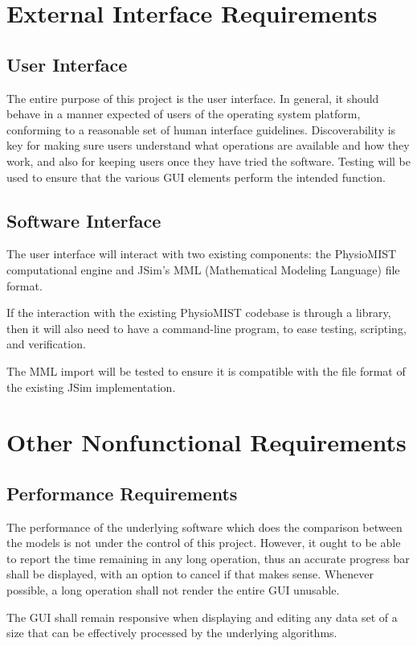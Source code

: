 \documentclass{article}
\begin{document}
\section{External Interface Requirements}
\subsection{User Interface}
The entire purpose of this project is the user interface. In general, it should behave in a manner expected of users of the operating system platform, conforming to a reasonable set of human interface guidelines. Discoverability is key for making sure users understand what operations are available and how they work, and also for keeping users once they have tried the software. Testing will be used to ensure that the various GUI elements perform the intended function.

\subsection{Software Interface}
The user interface will interact with two existing components: the PhysioMIST computational engine and JSim's MML (Mathematical Modeling Language) file format.

If the interaction with the existing PhysioMIST codebase is through a library, then it will also need to have a command-line program, to ease testing, scripting, and verification.

The MML import will be tested to ensure it is compatible with the file format of the existing JSim implementation.

\section{Other Nonfunctional Requirements}
\subsection{Performance Requirements}
The performance of the underlying software which does the comparison between the models is not under the control of this project. However, it ought to be able to report the time remaining in any long operation, thus an accurate progress bar shall be displayed, with an option to cancel if that makes sense. Whenever possible, a long operation shall not render the entire GUI unusable.

The GUI shall remain responsive when displaying and editing any data set of a size that can be effectively processed by the underlying algorithms.
\end{document}
